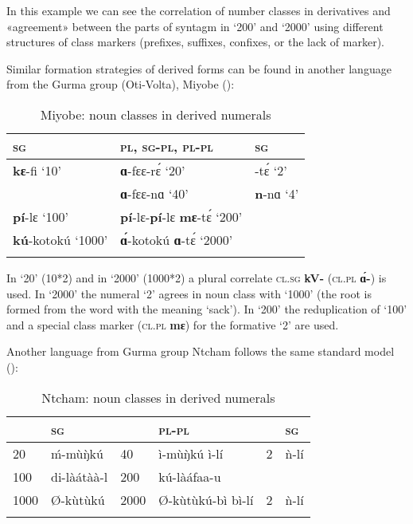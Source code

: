In this example we can see the correlation of number classes in derivatives and «agreement» between the parts of syntagm in ‘200’ and ‘2000’ using different structures of class markers (prefixes, suffixes, confixes, or the lack of marker). 

Similar formation strategies of derived forms can be found in another language from the Gurma group (Oti-Volta), Miyobe ():


\begin{table}
\caption{\label{tab:1:17} Miyobe: noun classes in derived numerals}

\begin{tabularx}{\textwidth}{lXX}
\lsptoprule

\textsc{sg} & \textsc{pl}, \textsc{sg}-\textsc{pl}, \textsc{pl}-\textsc{pl} & \textsc{sg}\\
\midrule
\textbf{kɛ}-fi ‘10’ & \textbf{ɑ}-fɛɛ-r{\'{ɛ}} ‘20’ & -t{\'{ɛ}} ‘2’\\
& \textbf{ɑ}-fɛɛ-nɑ ‘40’ & \textbf{n}-nɑ ‘4’\\
\textbf{p{\'{i}}}-lɛ ‘100’ & \textbf{p{\'{i}}}-lɛ-\textbf{p{\'{i}}}-lɛ \textbf{mɛ}-t{\'{ɛ}} ‘200’ & \\
\textbf{k{\'{u}}}-kotok{\'{u}} ‘1000’ & \textbf{{\'{ɑ}}}-kotok{\'{u}} \textbf{ɑ}-t{\'{ɛ}} ‘2000’ & \\
\lspbottomrule
\end{tabularx}
\end{table}


In ‘20’ (10*2) and in ‘2000’ (1000*2) a plural correlate \textsc{cl}.\textsc{sg} \textbf{kV-} (\textsc{cl}.\textsc{pl} \textbf{{\'{ɑ}}-}) is used. In ‘2000’ the numeral ‘2’ agrees in noun class with ‘1000’ (the root is formed from the word with the meaning ‘sack’). In ‘200’ the reduplication of ‘100’ and a special class marker (\textsc{cl}.\textsc{pl} \textbf{mɛ}) for the formative ‘2’ are used. 

Another language from Gurma group Ntcham follows the same standard model ():


\begin{table}
\caption{\label{tab:1:18} Ntcham: noun classes in derived numerals}

\begin{tabularx}{\textwidth}{lXlXlX}
\lsptoprule

& \textsc{sg} & & \textsc{pl}-\textsc{pl} & & \textsc{sg}\\
\midrule
20 &  {\'{m}}-m{\`{u}}{\`{ŋ}}k{\'{u}} & 40 &  ì-m{\`{u}}{\`{ŋ}}k{\'{u}} ì-l{\'{i}} & 2 &  {\`{n}}-l{\'{i}} \\
100 &  di-l{\`{a}}{\'{a}}t{\`{a}}{\`{a}}-l & 200 &  k{\'{u}}-l{\`{a}}{\'{a}}faa-u~ & \\
1000 &  Ø-k{\`{u}}t{\`{u}}k{\'{u}} & 2000 &  Ø-k{\`{u}}t{\`{u}}k{\'{u}}-bì  bì-l{\'{i}} & 2 &  {\`{n}}-l{\'{i}} \\
\lspbottomrule
\end{tabularx}
\end{table}


